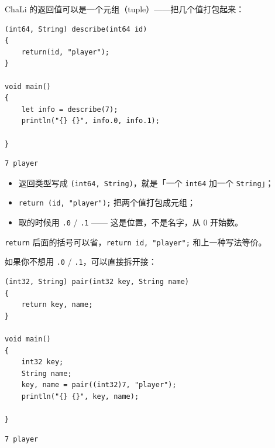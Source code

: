 ChaLi 的返回值可以是一个元组（tuple）——把几个值打包起来：

\par
\medskip
\begin{lstlisting}[style=chali]
(int64, String) describe(int64 id)
{
    return(id, "player");
}

void main()
{
    let info = describe(7);
    println("{} {}", info.0, info.1);

}
\end{lstlisting}
\par
\medskip

\par
\medskip
\begin{lstlisting}[style=out]
7 player
\end{lstlisting}
\par
\medskip

\begin{itemize}

\item 返回类型写成 \texttt{(\allowbreak{}int64,\allowbreak{} String)\allowbreak{}}，就是「一个 \texttt{int64} 加一个 \texttt{String}」；

\item \texttt{return (\allowbreak{}id,\allowbreak{} "player")\allowbreak{};} 把两个值打包成元组；

\item 取的时候用 \texttt{.\allowbreak{}0} / \texttt{.\allowbreak{}1} —— 这是位置，不是名字，从 0 开始数。

\end{itemize}

\texttt{return} 后面的括号可以省，\texttt{return id,\allowbreak{} "player";} 和上一种写法等价。

如果你不想用 \texttt{.\allowbreak{}0} / \texttt{.\allowbreak{}1}，可以直接拆开接：

\par
\medskip
\begin{lstlisting}[style=chali]
(int32, String) pair(int32 key, String name)
{
    return key, name;
}

void main()
{
    int32 key;
    String name;
    key, name = pair((int32)7, "player");
    println("{} {}", key, name);

}
\end{lstlisting}
\par
\medskip

\par
\medskip
\begin{lstlisting}[style=out]
7 player
\end{lstlisting}
\par
\medskip

